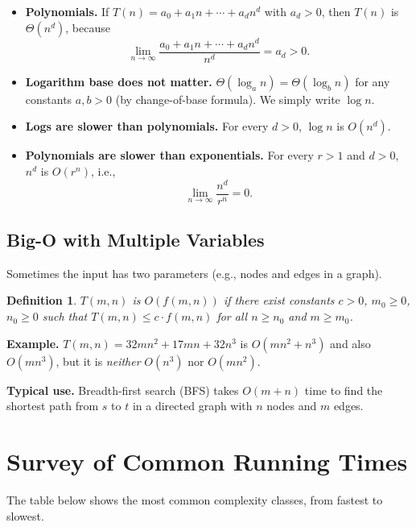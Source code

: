 \documentclass[12pt,a4paper]{report}
\newtheorem{definition}{Definition}
\begin{document}
\begin{itemize}
    \item \textbf{Polynomials.} If $T(n) = a_0 + a_1 n + \cdots + a_d n^d$ with $a_d > 0$,
    then $T(n)$ is $\Theta(n^d)$, because
    \[
        \lim_{n \to \infty} \frac{a_0 + a_1 n + \cdots + a_d n^d}{n^d} = a_d > 0.
    \]

    \item \textbf{Logarithm base does not matter.} $\Theta(\log_a n) = \Theta(\log_b n)$
    for any constants $a, b > 0$ (by change-of-base formula). We simply write $\log n$.

    \item \textbf{Logs are slower than polynomials.} For every $d > 0$,
    $\log n$ is $O(n^d)$.

    \item \textbf{Polynomials are slower than exponentials.} For every $r > 1$ and $d > 0$,
    $n^d$ is $O(r^n)$, i.e.,
    \[
        \lim_{n \to \infty} \frac{n^d}{r^n} = 0.
    \]
\end{itemize}

\subsection{Big-O with Multiple Variables}

Sometimes the input has two parameters (e.g., nodes and edges in a graph).

\begin{definition}
$T(m, n)$ is $O(f(m, n))$ if there exist constants $c > 0$, $m_0 \geq 0$, $n_0 \geq 0$
such that $T(m,n) \leq c \cdot f(m,n)$ for all $n \geq n_0$ and $m \geq m_0$.
\end{definition}

\textbf{Example.} $T(m,n) = 32mn^2 + 17mn + 32n^3$ is $O(mn^2 + n^3)$ and also
$O(mn^3)$, but it is \emph{neither} $O(n^3)$ nor $O(mn^2)$.

\textbf{Typical use.} Breadth-first search (BFS) takes $O(m + n)$ time to find the
shortest path from $s$ to $t$ in a directed graph with $n$ nodes and $m$ edges.

\section{Survey of Common Running Times}

The table below shows the most common complexity classes, from fastest to slowest.
\end{document}
